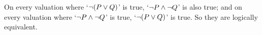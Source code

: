 On every valuation where `$\neg(P \vee Q)$' is true, `$\neg P \mathbin{\wedge} \neg Q$' is also true; and on every valuation where 
`$\neg P \mathbin{\wedge} \neg Q$' is true,  `$\neg(P \vee Q)$' is true. So they are logically equivalent. 



%
%
%
%



